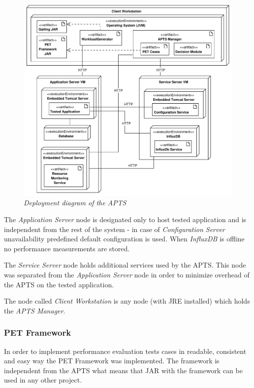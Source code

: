 \documentclass[10pt,a4paper]{article}
\begin{document}
\begin{figure}[!htb]
\centering
\includegraphics[width=1\textwidth]{APTSDeploymentDiagram}
\caption{\textit{Deployment diagram of the APTS}}
\label{deploymentapts}
\end{figure}



The \textit{Application Server} node is designated only to host tested application and is independent from the rest of the system - in case of \textit{Configuration Server} unavailability predefined default configuration is used. When \textit{InfluxDB} is offline no performance measurements are stored. 

The \textit{Service Server} node holds additional services used by the APTS. This node was separated from the \textit{Application Server} node in order to minimize overhead of the APTS on the tested application.

The node called \textit{Client Workstation} is any node (with JRE installed) which holds the \textit{APTS Manager}. 


\subsubsection{PET Framework} \label{framework}
 
In order to implement performance evaluation tests cases in readable, consistent and easy way the PET Framework was implemented. The framework is independent from the APTS what means that JAR with the framework can be used in any other project. 
\end{document}
